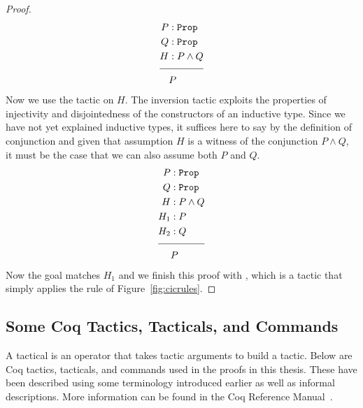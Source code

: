 \begin{expl}
\begin{proof}
\begin{align*}
P &: \coqtm{Prop} \\
Q &: \coqtm{Prop} \\
H &: P \wedge Q \\[\pfshift{}]
\cline{1-2}
& P
\end{align*}
Now we use the  tactic on $H$. The inversion tactic exploits the properties of injectivity and disjointedness of the constructors of an inductive type. Since we have not yet explained inductive types, it suffices here to say by the definition of conjunction and given that assumption $H$ is a witness of the conjunction $P \wedge Q$, it must be the case that we can also assume both $P$ and $Q$.
\begin{align*}
P &: \coqtm{Prop} \\
Q &: \coqtm{Prop} \\
H &: P \wedge Q \\
H_1 &: P \\
H_2 &: Q \\[\pfshift{}]
\cline{1-2}
& P
\end{align*}
Now the goal matches $H_1$ and we finish this proof with , which is a tactic that simply applies the  rule of Figure~\ref{fig:cicrules}. %

\end{proof}
\end{expl}


\subsection{Some Coq Tactics, Tacticals, and Commands}

A tactical is an operator that takes tactic arguments to build a tactic. Below are Coq tactics, tacticals, and commands used in the proofs in this thesis. These have been described using some terminology introduced earlier as well as informal descriptions. More information can be found in the Coq Reference Manual~\cite{coq}.

